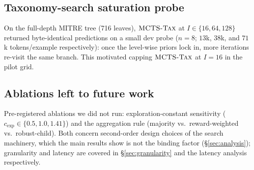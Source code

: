 \subsection{Taxonomy-search saturation probe}
On the full-depth MITRE tree (716 leaves), $\textsc{MCTS-Tax}$ at $I \in \{16, 64, 128\}$
returned byte-identical predictions on a small dev probe ($n{=}8$; $13$k, $38$k,
and $71$k tokens/example respectively): once the level-wise priors lock in, more
iterations re-visit the same branch. This motivated capping $\textsc{MCTS-Tax}$ at
$I{=}16$ in the pilot grid.

\subsection{Ablations left to future work}
Pre-registered ablations we did not run: exploration-constant sensitivity
($c_{\text{exp}} \in \{0.5, 1.0, 1.41\}$) and the aggregation rule (majority
vs.\ reward-weighted vs.\ robust-child). Both concern second-order design
choices of the search machinery, which the main results show is not the
binding factor (\S\ref{sec:analysis}); granularity and latency are covered in
\S\ref{sec:granularity} and the latency analysis respectively.
